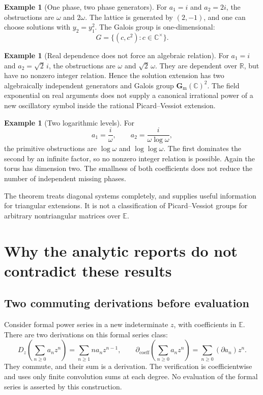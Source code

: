 \documentclass[11pt,a4paper]{article}
\numberwithin{equation}{section}
\theoremstyle{definition}
\newtheorem{example}[theorem]{Example}
\theoremstyle{remark}
\newcommand{\E}{\mathbb E}
\newcommand{\R}{\mathbb R}
\newcommand{\C}{\mathbb C}
\newcommand{\D}{\partial}
\newcommand{\gm}{\mathbf G_{\mathrm m}}
\begin{document}
\begin{example}[One phase, two phase generators]
For $a_1=i$ and $a_2=2i$, the obstructions are $\omega$ and $2\omega$.
The lattice is generated by $(2,-1)$, and one can choose solutions with
$y_2=y_1^2$. The Galois group is one-dimensional:
\[
 G=\{(c,c^2):c\in\C^{\times}\}.
\]
\end{example}

\begin{example}[Real dependence does not force an algebraic relation]
For $a_1=i$ and $a_2=\sqrt2\,i$, the obstructions are $\omega$ and
$\sqrt2\,\omega$. They are dependent over $\R$, but have no nonzero
integer relation. Hence the solution extension has two algebraically
independent generators and Galois group $\gm(\C)^2$.
The field exponential on real arguments does not supply a canonical
irrational power of a new oscillatory symbol inside the rational
Picard--Vessiot extension.
\end{example}

\begin{example}[Two logarithmic levels]
For
\[
 a_1=\frac{i}{\omega},\qquad
 a_2=\frac{i}{\omega\log\omega},
\]
the primitive obstructions are $\log\omega$ and $\log\log\omega$.
The first dominates the second by an infinite factor, so no nonzero
integer relation is possible. Again the torus has dimension two. The
smallness of both coefficients does not reduce the number of independent
missing phases.
\end{example}

The theorem treats diagonal systems completely, and supplies useful
information for triangular extensions. It is not a classification of
Picard--Vessiot groups for arbitrary nontriangular matrices over $\E$.

\section{Why the analytic reports do not contradict these results}\label{sec:external}

\subsection{Two commuting derivations before evaluation}
Consider formal power series in a new indeterminate $z$, with coefficients
in $\E$. There are two derivations on this formal series class:
\[
 D_z\left(\sum_{n\geq0}a_nz^n\right)
   =\sum_{n\geq1}na_nz^{n-1},\qquad
 \D_{\mathrm{coeff}}\left(\sum_{n\geq0}a_nz^n\right)
   =\sum_{n\geq0}(\D a_n)z^n.
\]
They commute, and their sum is a derivation. The verification is
coefficientwise and uses only finite convolution sums at each degree.
No evaluation of the formal series is asserted by this construction.
\end{document}
